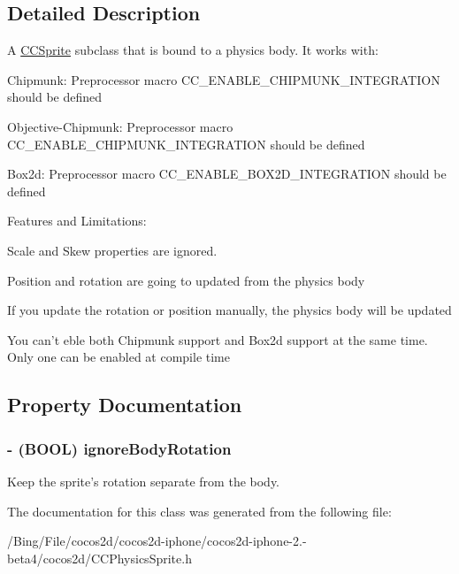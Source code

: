 \subsection{Detailed Description}
A \hyperlink{class_c_c_sprite}{C\-C\-Sprite} subclass that is bound to a physics body. It works with\-:
\begin{DoxyItemize}
\item Chipmunk\-: Preprocessor macro C\-C\-\_\-\-E\-N\-A\-B\-L\-E\-\_\-\-C\-H\-I\-P\-M\-U\-N\-K\-\_\-\-I\-N\-T\-E\-G\-R\-A\-T\-I\-O\-N should be defined
\item Objective-\/\-Chipmunk\-: Preprocessor macro C\-C\-\_\-\-E\-N\-A\-B\-L\-E\-\_\-\-C\-H\-I\-P\-M\-U\-N\-K\-\_\-\-I\-N\-T\-E\-G\-R\-A\-T\-I\-O\-N should be defined
\item Box2d\-: Preprocessor macro C\-C\-\_\-\-E\-N\-A\-B\-L\-E\-\_\-\-B\-O\-X2\-D\-\_\-\-I\-N\-T\-E\-G\-R\-A\-T\-I\-O\-N should be defined
\end{DoxyItemize}

Features and Limitations\-:
\begin{DoxyItemize}
\item Scale and Skew properties are ignored.
\item Position and rotation are going to updated from the physics body
\item If you update the rotation or position manually, the physics body will be updated
\begin{DoxyItemize}
\item You can't eble both Chipmunk support and Box2d support at the same time. Only one can be enabled at compile time 
\end{DoxyItemize}
\end{DoxyItemize}

\subsection{Property Documentation}
\hypertarget{interface_c_c_physics_sprite_abf440ef38284e79607c4c526d5cead43}{
\subsubsection[{ignore\-Body\-Rotation}]{\setlength{\rightskip}{0pt plus 5cm}-\/ (B\-O\-O\-L) {\bf ignore\-Body\-Rotation}}}\label{interface_c_c_physics_sprite_abf440ef38284e79607c4c526d5cead43}
Keep the sprite's rotation separate from the body. 

The documentation for this class was generated from the following file\-:\begin{DoxyCompactItemize}
\item 
/\-Bing/\-File/cocos2d/cocos2d-\/iphone/cocos2d-\/iphone-\/2.-\/beta4/cocos2d/C\-C\-Physics\-Sprite.\-h\end{DoxyCompactItemize}
